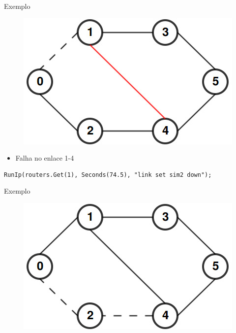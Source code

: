\documentclass{beamer}
\newlength{\wideitemsep}
\let\olditem\item
\renewcommand{\item}{\setlength{\itemsep}{\wideitemsep}\olditem}
\begin{document}
\begin{frame}[fragile]{Exemplo}
\begin{figure}[!htb]
\centering
\includegraphics[scale=0.5]{teste2.jpg}
\end{figure}
\begin{itemize}
 \item Falha no enlace 1-4 %
\end{itemize}
\begin{lstlisting}
RunIp(routers.Get(1), Seconds(74.5), "link set sim2 down");
\end{lstlisting}
\end{frame}

\begin{frame}[fragile]{Exemplo}
\begin{figure}[!htb]
\centering
\includegraphics[scale=0.5]{teste3.jpg}
\end{figure}
\end{frame}
\end{document}
